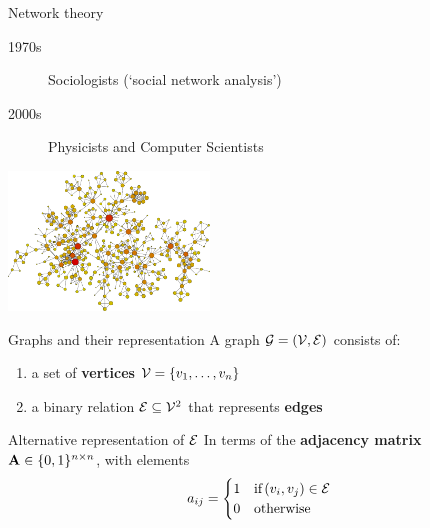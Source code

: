 \begin{frame}{Network theory}
    \begin{description}
        \item[1970s] Sociologists (`social network analysis')
        \item[2000s] Physicists and Computer Scientists
    \end{description}
    \vfill
    \begin{center}
        \includegraphics[height=10em]{figures/network}
    \end{center}
\end{frame}

\begin{frame}{Graphs and their representation}
    A graph $\mathcal{G} = \left( \mathcal{V}, \mathcal{E} \right)$ consists of:
    \begin{enumerate}
        \item a set of \textbf{vertices}
              $\mathcal{V} = \left\{ v_{1}, \ldots, v_{n} \right\}$
        \item a binary relation $\mathcal{E} \subseteq \mathcal{V}^{2}$ that represents
              \textbf{edges}
    \end{enumerate}
    \vfill\pause
    \begin{block}{Alternative representation of $\mathcal{E}$}
        In terms of the \textbf{adjacency matrix}
        $\mathbf{A} \in \{ 0, 1 \}^{n \times n}$, with elements
        \[
            a_{ij} =
            \begin{cases}
                1 & \text{if} \left( v_{i}, v_{j} \right) \in \mathcal{E} \\
                0 & \text{otherwise}
            \end{cases}
        \]
    \end{block}
\end{frame}

